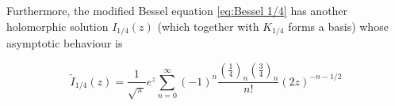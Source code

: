 \documentclass{article}
\theoremstyle{definition}
\theoremstyle{plain}
\begin{document}
Furthermore, the modified Bessel equation \eqref{eq:Bessel 1/4} has another holomorphic solution $I_{1/4}(z)$ (which together with ${K}_{1/4}$ forms a basis) whose asymptotic behaviour is 

\begin{equation}
\tilde{I}_{1/4}(z)=\frac{1}{\sqrt{\pi}}e^{z}\sum_{n= 0}^{\infty}(-1)^n\frac{\left(\frac{1}{4}\right)_n\left(\frac{3}{4}\right)_n}{n!}\left(2z\right)^{-n-1/2}
\end{equation}
\end{document}
